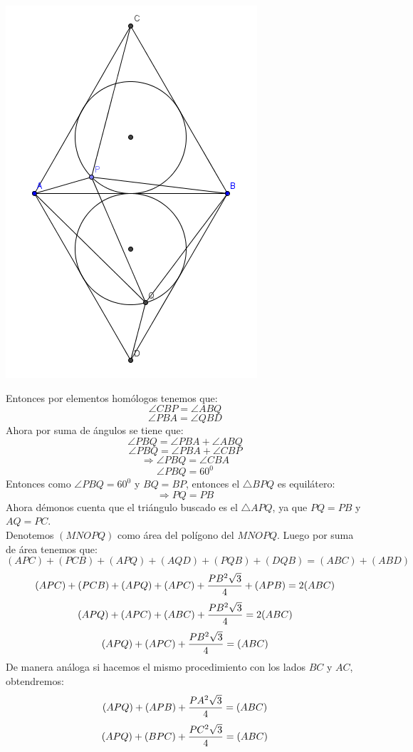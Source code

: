 \documentclass{book}
\begin{document}
\begin{enumerate}
        \begin{center}
            \includegraphics[scale=1]{imagenes/Geometria/24,1.png}
        \end{center}
        Entonces por elementos homólogos tenemos que:
        $$\angle CBP=\angle ABQ$$
        $$\angle PBA=\angle QBD$$
        Ahora por suma de ángulos se tiene que:
        $$\angle PBQ=\angle PBA+\angle ABQ$$
        $$\angle PBQ=\angle PBA+\angle CBP$$
        $$\Rightarrow\angle PBQ=\angle CBA$$
        $$\angle PBQ=60^0$$
        Entonces como $\angle PBQ=60^0$ y $BQ=BP$, entonces el $\triangle BPQ$ es equilátero:
        $$\Rightarrow PQ=PB$$
        Ahora démonos cuenta que el triángulo buscado es el $\triangle APQ$, ya que $PQ=PB$ y $AQ=PC$.\\
        Denotemos $(MNOPQ)$ como área del polígono del $MNOPQ$.
        Luego por suma de área tenemos que:
        $$(APC)+(PCB)+(APQ)+(AQD)+(PQB)+(DQB)=(ABC)+(ABD)$$
        $$(APC)+(PCB)+(APQ)+(APC)+{PB^2\sqrt{3}\over 4}+(APB)=2(ABC)$$
        $$(APQ)+(APC)+(ABC)+{PB^2\sqrt{3}\over 4}=2(ABC)$$
        $$(APQ)+(APC)+{PB^2\sqrt{3}\over 4}=(ABC)$$
        De manera análoga si hacemos el mismo procedimiento con los lados $BC$ y $AC$, obtendremos:
        $$(APQ)+(APB)+{PA^2\sqrt{3}\over 4}=(ABC)$$
        $$(APQ)+(BPC)+{PC^2\sqrt{3}\over 4}=(ABC)$$

\end{enumerate}
\end{document}
